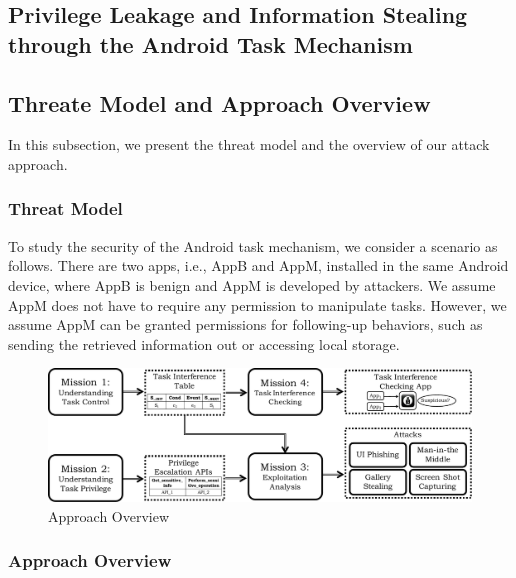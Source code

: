 \documentclass[letterpaper,12pt]{article}
\begin{document}
   \newpage
   \begin{singlespace}
   \section{Privilege Leakage and Information Stealing through the Android Task Mechanism}
   \label{sec:atmtitle}
   \end{singlespace}




\subsection{Threate Model and Approach Overview} \label{sec:threatandapproach}

In this subsection, we present the threat model and the overview of our attack approach.

\subsubsection{Threat Model} \label{subsec:threat}

To study the security of the Android task mechanism, we consider a
scenario as follows. There are two apps, i.e., AppB and AppM,
installed in the same Android device, where AppB is benign and AppM is
developed by attackers.  We assume AppM does not have to require any
permission to manipulate tasks. However, we assume AppM can be granted
permissions for following-up behaviors, such as sending the retrieved
information out or accessing local storage.

\begin{figure}[t]
        \centering
        \includegraphics[width=1\linewidth]{overall.pdf}
        \caption{Approach Overview}
        \label{fig:arch}
\end{figure}

\subsubsection{Approach Overview} \label{sec:approachoverview}
\end{document}
